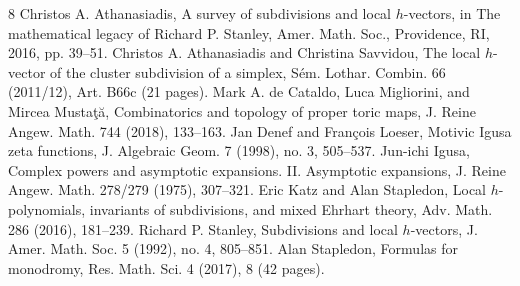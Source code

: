 \begin{thebibliography}{8}
 Christos A. Athanasiadis, A survey of subdivisions and local $h$-vectors, in The mathematical legacy of Richard P. Stanley, Amer. Math. Soc., Providence, RI, 2016, pp. 39--51.
 Christos A. Athanasiadis and Christina Savvidou, The local $h$-vector of the cluster subdivision of a simplex, S\'em. Lothar. Combin. 66 (2011/12), Art. B66c (21 pages).
 Mark A. de Cataldo, Luca Migliorini, and Mircea Musta\c{t}\u{a}, Combinatorics and topology of proper toric maps, J. Reine Angew. Math. 744 (2018), 133--163.
 Jan Denef and Fran\c{c}ois Loeser, Motivic Igusa zeta functions, J. Algebraic Geom. 7 (1998), no. 3, 505--537.
 Jun-ichi Igusa, Complex powers and asymptotic expansions. II. Asymptotic expansions, J. Reine Angew. Math. 278/279 (1975), 307--321.
 Eric Katz and Alan Stapledon, Local $h$-polynomials, invariants of subdivisions, and mixed Ehrhart theory, Adv. Math. 286 (2016), 181--239.
 Richard P. Stanley, Subdivisions and local $h$-vectors, J. Amer. Math. Soc. 5 (1992), no. 4, 805--851.
 Alan Stapledon, Formulas for monodromy, Res. Math. Sci. 4 (2017), 8 (42 pages).
\end{thebibliography}
